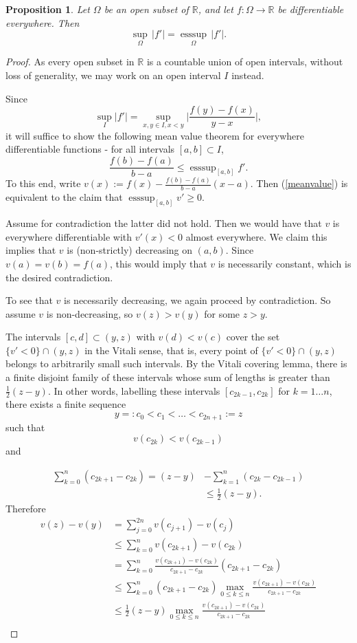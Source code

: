 \documentclass{article}
\newtheorem{proposition}[theorem]{Proposition}
\DeclareMathOperator{\esssup}{esssup}
\begin{document}
\begin{proposition}\label{oned}
   Let $\Omega$ be an open subset of $\mathbb R$, and let $f: \Omega \to \mathbb R$ be differentiable everywhere. Then 
   $$\underset{\Omega}{\sup} \, |f'| = \underset{\Omega}{\esssup} \, |f'|.$$
\end{proposition}
\begin{proof}
As every open subset in $\mathbb R$ is a countable union of open intervals, without loss of generality, we may work on an open interval $I$ instead. 

 Since $$\sup_I |f'|=\sup_{x, y \in I, x < y} \Big|\frac{f(y)-f(x)}{y-x}\Big|,$$ it will suffice to show the following mean value theorem for everywhere differentiable functions - for all intervals $[a, b] \subset I$,
\begin{equation}\label{meanvalue} 
 \frac{f(b)-f(a)}{b-a}\leq \esssup_{[a, b]} f' .
\end{equation}
To this end, write $v(x):=f(x)-\frac{f(b)-f(a)}{b-a}(x-a)$. Then (\ref{meanvalue}) is equivalent to the claim that $\esssup_{[a, b]} v' \geq 0$. 

\noindent Assume for contradiction the latter did not hold. Then we would have that $v$ is everywhere differentiable with $v'(x) < 0$ almost everywhere. We claim this implies that $v$ is (non-strictly) decreasing on $(a, b)$. Since $v(a) = v(b) = f(a)$, this would imply that $v$ is necessarily constant, which is the desired contradiction.

To see that $v$ is necessarily decreasing, we again proceed by contradiction. So assume $v$ is non-decreasing, so $v(z)>v(y)$ for some $z > y$.

The intervals $[c,d]\subset(y, z)$ with $v(d)<v(c)$ cover the set $\{v'<0\} \cap (y,z)$ in the Vitali sense, that is,  every point of $\{v'<0\} \cap (y,z)$ belongs to arbitrarily small such intervals. By the Vitali covering lemma, there is a finite  disjoint family of these intervals whose sum of lengths is greater than $\frac12(z-y)$. In other words, labelling these intervals $[c_{2k-1},c_{2k}]$ for $k=1\dots n$, there exists  a finite  sequence $$y =: c_0 < c_1<\dots < c_{2n+1}:=z$$  such that $$v(c_{2k})<v(c_{2k-1})$$ and

$$
\begin{aligned}
\sum_{k=0}^n(c_{2k+1}-c_{2k})=(z-y) &- \sum_{k=1}^n(c_{2k}-c_{2k-1})  \\
&\le \frac12(z-y).
\end{aligned}$$
\noindent Therefore 
$$\begin{aligned}
v(z)-v(y)&= \sum_{j=0}^{2n} v(c_{j+1})-v(c_j)  \\
&\le \sum_{k=0}^nv(c_{2k+1})-v(c_{2k}) \\
&=\sum_{k=0}^n\frac{v(c_{2k+1})-v(c_{2k})}{c_{2k+1}-c_{2k}}(c_{2k+1}-c_{2k}) \\
&\le  \sum_{k=0}^n(c_{2k+1}-c_{2k})\max_{0\le k\le n} \frac{v(c_{2k+1})-v(c_{2k})}{c_{2k+1}-c_{2k}} \\
&\le\frac12(z-y)\max_{0\le k\le n} \frac{v(c_{2k+1})-v(c_{2k})}{c_{2k+1}-c_{2k}} \\
\end{aligned}$$


\end{proof}
\end{document}
